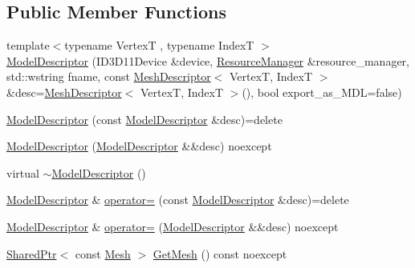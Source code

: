 \subsection*{Public Member Functions}
\begin{DoxyCompactItemize}
\item 
{\footnotesize template$<$typename VertexT , typename IndexT $>$ }\\\mbox{\hyperlink{classmage_1_1rendering_1_1_model_descriptor_a69a6ffd3c69cec0ef7f395a5228158ea}{Model\+Descriptor}} (I\+D3\+D11\+Device \&device, \mbox{\hyperlink{classmage_1_1rendering_1_1_resource_manager}{Resource\+Manager}} \&resource\+\_\+manager, std\+::wstring fname, const \mbox{\hyperlink{classmage_1_1rendering_1_1_mesh_descriptor}{Mesh\+Descriptor}}$<$ VertexT, IndexT $>$ \&desc=\mbox{\hyperlink{classmage_1_1rendering_1_1_mesh_descriptor}{Mesh\+Descriptor}}$<$ VertexT, IndexT $>$(), bool export\+\_\+as\+\_\+\+M\+DL=false)
\item 
\mbox{\hyperlink{classmage_1_1rendering_1_1_model_descriptor_af3fc0dea0060aa15a8003a7f4f807dd0}{Model\+Descriptor}} (const \mbox{\hyperlink{classmage_1_1rendering_1_1_model_descriptor}{Model\+Descriptor}} \&desc)=delete
\item 
\mbox{\hyperlink{classmage_1_1rendering_1_1_model_descriptor_a0e7a576be083c9499a074cfd39acbcb7}{Model\+Descriptor}} (\mbox{\hyperlink{classmage_1_1rendering_1_1_model_descriptor}{Model\+Descriptor}} \&\&desc) noexcept
\item 
virtual \mbox{\hyperlink{classmage_1_1rendering_1_1_model_descriptor_adef21799bc748828e8e04bc74f86aac0}{$\sim$\+Model\+Descriptor}} ()
\item 
\mbox{\hyperlink{classmage_1_1rendering_1_1_model_descriptor}{Model\+Descriptor}} \& \mbox{\hyperlink{classmage_1_1rendering_1_1_model_descriptor_a6d27a72aa2ebffbe4e7f2635f803dd72}{operator=}} (const \mbox{\hyperlink{classmage_1_1rendering_1_1_model_descriptor}{Model\+Descriptor}} \&desc)=delete
\item 
\mbox{\hyperlink{classmage_1_1rendering_1_1_model_descriptor}{Model\+Descriptor}} \& \mbox{\hyperlink{classmage_1_1rendering_1_1_model_descriptor_a52e9fbf292efc7a803d367bb3b6cb962}{operator=}} (\mbox{\hyperlink{classmage_1_1rendering_1_1_model_descriptor}{Model\+Descriptor}} \&\&desc) noexcept
\item 
\mbox{\hyperlink{namespacemage_a1e01ae66713838a7a67d30e44c67703e}{Shared\+Ptr}}$<$ const \mbox{\hyperlink{classmage_1_1rendering_1_1_mesh}{Mesh}} $>$ \mbox{\hyperlink{classmage_1_1rendering_1_1_model_descriptor_a65645313d8b7bb976d1b5d0acdbbd38a}{Get\+Mesh}} () const noexcept

\end{DoxyCompactItemize}
